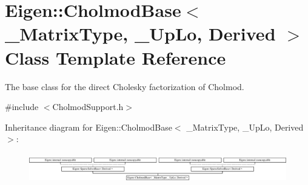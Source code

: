 \hypertarget{class_eigen_1_1_cholmod_base}{}\section{Eigen\+:\+:Cholmod\+Base$<$ \+\_\+\+Matrix\+Type, \+\_\+\+Up\+Lo, Derived $>$ Class Template Reference}
\label{class_eigen_1_1_cholmod_base}


The base class for the direct Cholesky factorization of Cholmod.  




{\ttfamily \#include $<$Cholmod\+Support.\+h$>$}

Inheritance diagram for Eigen\+:\+:Cholmod\+Base$<$ \+\_\+\+Matrix\+Type, \+\_\+\+Up\+Lo, Derived $>$\+:\begin{figure}[H]
\begin{center}
\leavevmode
\includegraphics[height=1.280488cm]{class_eigen_1_1_cholmod_base}
\end{center}
\end{figure}
